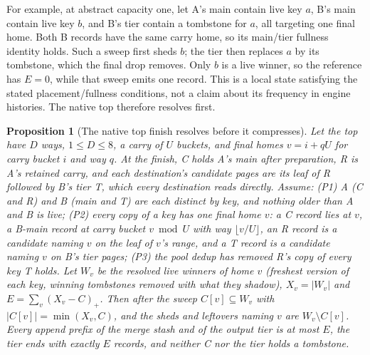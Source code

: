 \documentclass[11pt]{article}
\newtheorem{proposition}[theorem]{Proposition}
\theoremstyle{definition}
\theoremstyle{remark}
\begin{document}
For example, at abstract capacity one, let A's main contain live key $a$,
B's main contain live key $b$, and B's tier contain a tombstone for $a$,
all targeting one final home. Both B records have the same carry home,
so its main/tier fullness identity holds. Such a sweep first sheds $b$;
the tier then replaces $a$ by its tombstone, which the final drop removes.
Only $b$ is a live winner, so the reference has $E=0$, while that sweep
emits one record. This is a local state satisfying the stated
placement/fullness conditions, not a claim about its frequency in engine
histories. The native top therefore resolves first.

\begin{proposition}[The native top finish resolves before it compresses]
\label{prop:top-resolution}
Let the top have $D$ ways, $1\le D\le8$, a carry of $U$ buckets, and final
homes $v=i+qU$ for carry bucket $i$ and way $q$. At the finish, C holds A's
main after preparation, R is A's retained carry, and each destination's
candidate pages are its leaf of R followed by B's tier T, which every
destination reads directly. Assume:
(P1) A (C and R) and B (main and T) are each distinct by key, and nothing
older than A and B is live;
(P2) every copy of a key has one final home $v$: a C record lies at $v$, a
B-main record at carry bucket $v\bmod U$ with way $\lfloor v/U\rfloor$, an
R record is a candidate naming $v$ on the leaf of $v$'s range, and a T
record is a candidate naming $v$ on B's tier pages;
(P3) the pool dedup has removed R's copy of every key T holds.
Let $W_v$ be the resolved live winners of home $v$ (freshest version of
each key, winning tombstones removed with what they shadow), $X_v=|W_v|$ and
$E=\sum_v(X_v-C)_+$. Then after the sweep $C[v]\subseteq W_v$ with
$|C[v]|=\min(X_v,C)$, and the sheds and leftovers naming $v$ are
$W_v\setminus C[v]$. Every append prefix of the merge stash and of the
output tier is at most $E$, the tier ends with exactly $E$ records, and
neither C nor the tier holds a tombstone.
\end{proposition}
\end{document}
